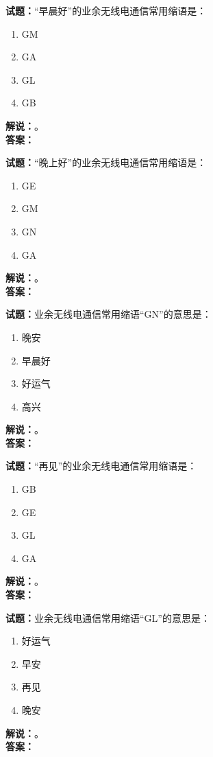 \documentclass{ctexbook}
\begin{document}
\bigskip




\noindent\textbf{试题：}“早晨好”的业余无线电通信常用缩语是：
\begin{enumerate}[leftmargin=3em]
\item GM
\item GA
\item GL
\item GB
\end{enumerate}
\noindent\textbf{解说：}\textbf{}。\\\noindent\textbf{答案：}

\bigskip




\noindent\textbf{试题：}“晚上好”的业余无线电通信常用缩语是：
\begin{enumerate}[leftmargin=3em]
\item GE
\item GM
\item GN
\item GA
\end{enumerate}
\noindent\textbf{解说：}\textbf{}。\\\noindent\textbf{答案：}

\bigskip




\noindent\textbf{试题：}业余无线电通信常用缩语“GN”的意思是：
\begin{enumerate}[leftmargin=3em]
\item 晚安
\item 早晨好
\item 好运气
\item 高兴
\end{enumerate}
\noindent\textbf{解说：}\textbf{}。\\\noindent\textbf{答案：}

\bigskip




\noindent\textbf{试题：}“再见”的业余无线电通信常用缩语是：
\begin{enumerate}[leftmargin=3em]
\item GB
\item GE
\item GL
\item GA
\end{enumerate}
\noindent\textbf{解说：}\textbf{}。\\\noindent\textbf{答案：}

\bigskip




\noindent\textbf{试题：}业余无线电通信常用缩语“GL”的意思是：
\begin{enumerate}[leftmargin=3em]
\item 好运气
\item 早安
\item 再见
\item 晚安
\end{enumerate}
\noindent\textbf{解说：}\textbf{}。\\\noindent\textbf{答案：}
\end{document}
